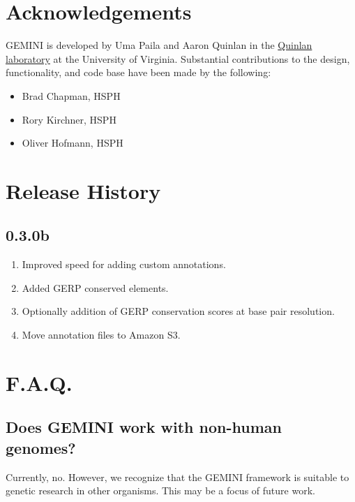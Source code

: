 \documentclass[letterpaper,10pt,english]{sphinxmanual}
\begin{document}
\section{Acknowledgements}
\label{content/acknowledgements:acknowledgements}\label{content/acknowledgements::doc}
GEMINI is developed by Uma Paila and Aaron Quinlan in the
\href{http://quinlanlab.org/}{Quinlan laboratory} at the University of Virginia.
Substantial contributions to the design, functionality, and code base have been
made by the following:
\begin{itemize}
\item {} 
Brad Chapman, HSPH

\item {} 
Rory Kirchner, HSPH

\item {} 
Oliver Hofmann, HSPH

\end{itemize}


\section{Release History}
\label{content/history::doc}\label{content/history:release-history}

\subsection{0.3.0b}
\label{content/history:b}\begin{enumerate}
\item {} 
Improved speed for adding custom annotations.

\item {} 
Added GERP conserved elements.

\item {} 
Optionally addition of GERP conservation scores at base pair resolution.

\item {} 
Move annotation files to Amazon S3.

\end{enumerate}


\section{F.A.Q.}
\label{content/faq::doc}\label{content/faq:f-a-q}

\subsection{Does GEMINI work with non-human genomes?}
\label{content/faq:does-gemini-work-with-non-human-genomes}
Currently, no.  However, we recognize that the GEMINI framework is suitable to
genetic research in other organisms. This may be a focus of future work.
\end{document}

